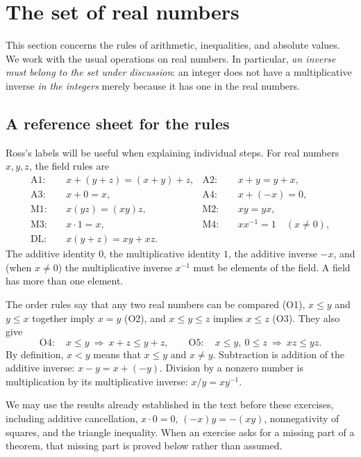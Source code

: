 \section{The set of real numbers}

This section concerns the rules of arithmetic, inequalities, and absolute
values. We work with the usual operations on real numbers. In particular,
\emph{an inverse must belong to the set under discussion}: an integer does
not have a multiplicative inverse \emph{in the integers} merely because it
has one in the real numbers.

\subsection*{A reference sheet for the rules}
Ross's labels will be useful when explaining individual steps. For real
numbers $x,y,z$, the field rules are
\begin{align*}
 \mathrm{A1}:&\quad x+(y+z)=(x+y)+z,
 &\mathrm{A2}:&\quad x+y=y+x,\\
 \mathrm{A3}:&\quad x+0=x,
 &\mathrm{A4}:&\quad x+(-x)=0,\\
 \mathrm{M1}:&\quad x(yz)=(xy)z,
 &\mathrm{M2}:&\quad xy=yx,\\
 \mathrm{M3}:&\quad x\cdot1=x,
 &\mathrm{M4}:&\quad xx^{-1}=1\quad(x\ne0),\\
 \mathrm{DL}:&\quad x(y+z)=xy+xz.
\end{align*}
The additive identity $0$, the multiplicative identity $1$, the additive
inverse $-x$, and (when $x\ne0$) the multiplicative inverse $x^{-1}$ must
be elements of the field. A field has more than one element.

The order rules say that any two real numbers can be compared (O1),
$x\le y$ and $y\le x$ together imply $x=y$ (O2), and
$x\le y\le z$ implies $x\le z$ (O3). They also give
\[
 \mathrm{O4}:\quad x\le y\ \Longrightarrow\ x+z\le y+z,
 \qquad
 \mathrm{O5}:\quad x\le y,\ 0\le z\ \Longrightarrow\ xz\le yz.
\]
By definition, $x<y$ means that $x\le y$ and $x\ne y$.
Subtraction is addition of the additive inverse:
$x-y=x+(-y)$. Division by a nonzero number is multiplication by its
multiplicative inverse: $x/y=xy^{-1}$.

We may use the results already established in the text before these
exercises, including additive cancellation, $x\cdot0=0$,
$(-x)y=-(xy)$, nonnegativity of squares, and the triangle inequality.
When an exercise asks for a missing part of a theorem, that missing part
is proved below rather than assumed.

